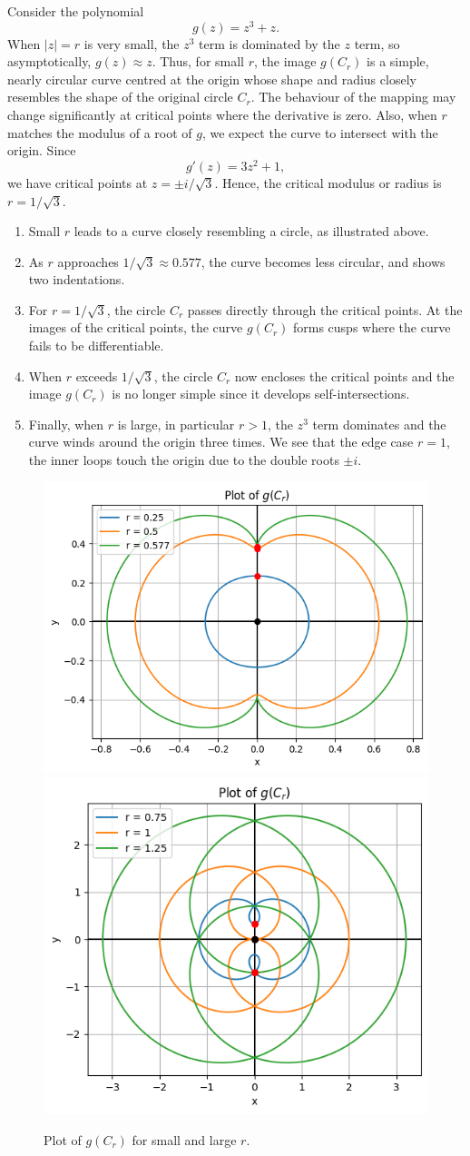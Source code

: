 \documentclass{article}
\begin{document}
Consider the polynomial
\[ g(z) = z^3 + z. \]
When \(|z| = r\) is very small, the \(z^3\) term is dominated by the \(z\) term, so asymptotically, \(g(z) \approx z\). Thus, for small \(r\), the image \(g(C_r)\) is a simple, nearly circular curve centred at the origin whose shape and radius closely resembles the shape of the original circle \(C_r\). The behaviour of the mapping may change significantly at critical points where the derivative is zero. Also, when \(r\) matches the modulus of a root of \(g\), we expect the curve to intersect with the origin. Since 
\[ g'(z) = 3z^2 + 1, \]
we have critical points at \(z = \pm i/\sqrt3\). Hence, the critical modulus or radius is \(r = 1/\sqrt{3}\).
\begin{enumerate}
    \item Small \(r\) leads to a curve closely resembling a circle, as illustrated above.
    \item As \(r\) approaches \(1/\sqrt{3} \approx 0.577\), the curve becomes less circular, and shows two indentations.
    \item For \(r = 1/\sqrt{3}\), the circle \(C_r\) passes directly through the critical points. At the images of the critical points, the curve \(g(C_r)\) forms cusps where the curve fails to be differentiable.
    \item When \(r\) exceeds \(1/\sqrt{3}\), the circle \(C_r\) now encloses the critical points and the image \(g(C_r)\) is no longer simple since it develops self-intersections.
    \item Finally, when \(r\) is large, in particular \(r > 1\), the \(z^3\) term dominates and the curve winds around the origin three times. We see that the edge case \(r = 1\), the inner loops touch the origin due to the double roots \(\pm i\).
\end{enumerate}

\begin{figure}
    \centering
    \includegraphics[width=0.49\linewidth]{images/smallr.png}
    \includegraphics[width=0.49\linewidth]{images/larger.png}
    \caption{Plot of \(g(C_r)\) for small and large \(r\).}
\end{figure}
\end{document}
